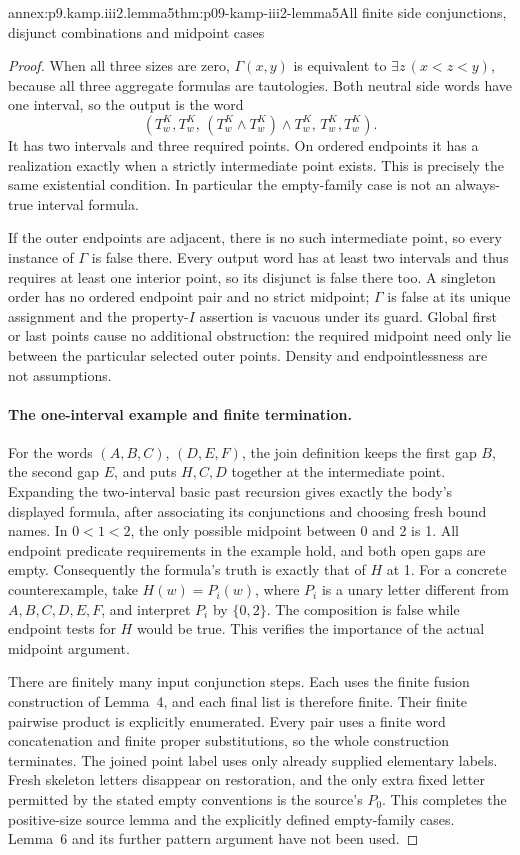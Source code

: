 \begin{annexitem}{annex:p9.kamp.iii2.lemma5}{thm:p09-kamp-iii2-lemma5}{All finite side conjunctions, disjunct combinations and midpoint cases}
\begin{proof}
When all three sizes are zero, \(\Gamma(x,y)\) is equivalent to
\(\exists z\,(x<z<y)\), because all three aggregate formulas are
tautologies. Both neutral side words have one interval, so the output
is the word
\[
        (T^K_w,T^K_w,\,
          (T^K_w\land T^K_w)\land T^K_w,\,
          T^K_w,T^K_w).
\]
It has two intervals and three required points. On ordered endpoints
it has a realization exactly when a strictly intermediate point exists.
This is precisely the same existential condition. In particular the
empty-family case is not an always-true interval formula.

If the outer endpoints are adjacent, there is no such intermediate
point, so every instance of \(\Gamma\) is false there. Every output
word has at least two intervals and thus requires at least one
interior point, so its disjunct is false there too. A singleton order
has no ordered endpoint pair and no strict midpoint; \(\Gamma\)
is false at its unique assignment and the property-\(I\) assertion
is vacuous under its guard. Global first or last points cause no
additional obstruction: the required midpoint need only lie between
the particular selected outer points. Density and endpointlessness
are not assumptions.

\paragraph{The one-interval example and finite termination.}
For the words \((A,B,C)\), \((D,E,F)\), the join definition
keeps the first gap \(B\), the second gap \(E\), and puts
\(H,C,D\) together at the intermediate point. Expanding the
two-interval basic past recursion gives exactly the body's displayed
formula, after associating its conjunctions and choosing fresh
bound names. In \(0<1<2\), the only possible midpoint between 0
and 2 is 1. All endpoint predicate requirements in the example
hold, and both open gaps are empty. Consequently the formula's
truth is exactly that of \(H\) at 1. For a concrete counterexample,
take \(H(w)=P_i(w)\), where \(P_i\) is a unary letter different
from \(A,B,C,D,E,F\), and interpret \(P_i\) by \(\{0,2\}\).
The composition is false while endpoint tests for \(H\) would
be true. This verifies the importance of the actual midpoint argument.

There are finitely many input conjunction steps. Each uses the finite
fusion construction of Lemma~4, and each final list is therefore finite.
Their finite pairwise product is explicitly enumerated. Every pair
uses a finite word concatenation and finite proper substitutions,
so the whole construction terminates. The joined point label uses
only already supplied elementary labels. Fresh skeleton letters
disappear on restoration, and the only extra fixed letter permitted
by the stated empty conventions is the source's \(P_0\).
This completes the positive-size source lemma and the explicitly
defined empty-family cases. Lemma~6 and its further pattern argument
have not been used.
\end{proof}
\end{annexitem}
